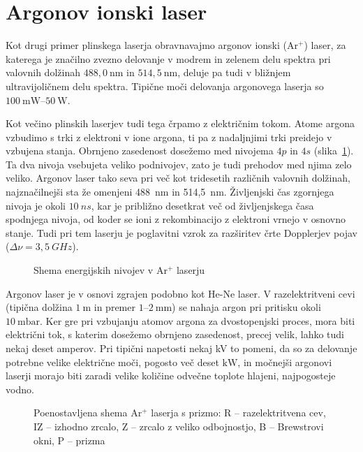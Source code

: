 \section{Argonov ionski laser}
Kot drugi primer plinskega laserja obravnavajmo argonov ionski (Ar$^+$) laser,
za katerega je značilno zvezno delovanje v modrem in zelenem delu spektra pri 
valovnih dolžinah $488,0~\si{\nano\metre}$ in $514,5~\si{\nano\metre}$, deluje 
pa tudi v bližnjem ultravijoličnem delu spektra. Tipične moči delovanja argonovega laserja
so $100~\si{\milli\watt}$--$50~\si{\watt}$.

Kot večino plinskih laserjev tudi tega črpamo z električnim tokom.
Atome argona vzbudimo s trki z elektroni v ione argona, ti pa z nadaljnjimi
trki preidejo v vzbujena stanja. Obrnjeno zasedenost
dosežemo med nivojema $4p$ in $4s$ (slika~\ref{fig:ArE}). 
Ta dva nivoja vsebujeta veliko podnivojev, zato je tudi prehodov med
njima zelo veliko. Argonov laser tako seva pri več kot tridesetih različnih
valovnih dolžinah, najznačilnejši sta že omenjeni 488~nm in 514,5~nm. 
Življenjski čas zgornjega nivoja je okoli $10~\si{ns}$, kar je približno 
desetkrat več od življenjskega časa spodnjega nivoja, od koder se ioni
z rekombinacijo z elektroni vrnejo v osnovno stanje. Tudi pri tem laserju
je poglavitni vzrok za razširitev črte Dopplerjev 
pojav ($\Delta \nu = 3,5~\si{GHz}$).

\begin{figure}[h]
\centering
\def\svgwidth{80truemm} 

\caption{Shema energijskih nivojev v Ar$^+$ laserju}
\label{fig:ArE}
\end{figure}

Argonov laser je v osnovi zgrajen podobno kot He-Ne laser. 
V razelektritveni cevi
(tipična dolžina $1~\si{\metre}$ in premer $1$--$2~\si{\milli\metre}$)
se nahaja argon pri pritisku okoli $10~\si{\milli\bar}$. Ker gre pri 
vzbujanju atomov argona za dvostopenjski proces, mora biti električni tok, 
s katerim dosežemo obrnjeno zasedenost, precej velik, lahko tudi nekaj deset amperov. 
Pri tipični napetosti nekaj kV to pomeni, da so za delovanje potrebne velike električne moči, 
pogosto več deset $\si{\kilo\watt}$, in močnejši argonovi laserji morajo biti
zaradi velike količine odvečne toplote hlajeni, najpogosteje vodno.

\begin{figure}[h]
\centering
\def\svgwidth{110truemm} 

\caption{Poenostavljena shema Ar$^+$ laserja s prizmo: R -- razelektritvena cev, 
IZ -- izhodno zrcalo, Z -- zrcalo z veliko odbojnostjo, B -- Brewstrovi okni, 
P -- prizma
}
\label{fig:ArS}
\end{figure}

